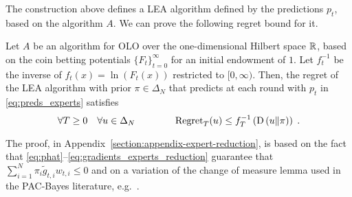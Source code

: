 The construction above defines a \ac{LEA} algorithm defined by the predictions
$p_t$, based on the algorithm $A$.  We can prove the following regret bound for
it.
%
\begin{theorem}
\label{theorem:regret-bound-experts}
Let $A$ be an algorithm for \ac{OLO} over the one-dimensional Hilbert space
$\mathbb{R}$, based on the coin betting potentials $\{F_t\}_{t=0}^\infty$ for an
initial endowment of $1$. Let $f_t^{-1}$ be the inverse of $f_t(x) =
\ln(F_t(x))$ restricted to $[0,\infty)$.  Then, the regret of the \ac{LEA}
algorithm with prior $\pi \in \Delta_N$ that predicts at each round with $p_t$
in \eqref{eq:preds_experts} satisfies
\[
\forall T \ge 0 \quad \forall u \in \Delta_N \qquad \qquad
\operatorname{Regret}_T(u) \le f_T^{-1}\left( \operatorname{D}\left({u}\middle\|{\pi}\right) \right) \; .
\]
\end{theorem}
The proof, in Appendix~\ref{section:appendix-expert-reduction}, is based on the
fact that \eqref{eq:phat}--\eqref{eq:gradients_experts_reduction} guarantee
that $\sum_{i=1}^N \pi_i \widetilde g_{t,i} w_{t,i} \le 0$ and on a variation
of the change of measure lemma used in the PAC-Bayes literature,
e.g.~\cite{McAllester-2013}.
